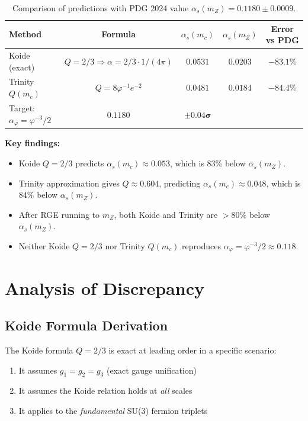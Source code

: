 \documentclass{article}
\begin{document}
\begin{table}[h]
\begin{table}[h]
\centering
\caption{Comparison of predictions with PDG 2024 value $\alpha_s(m_Z) = 0.1180 \pm 0.0009$.}
\label{tab:alpha-comparison}
\renewcommand{\arraystretch}{1.2}
\begin{tabular}{lcccc}
\toprule
Method & Formula & $\alpha_s(m_c)$ & $\alpha_s(m_Z)$ & Error vs PDG \\
\midrule
Koide (exact) & $Q = 2/3 \Rightarrow \alpha = 2/3 \cdot 1/(4\pi)$ & $0.0531$ & $0.0203$ & $\mathbf{-83.1\%}$ \\
Trinity $Q(m_c)$ & $Q = 8\varphi^{-1}e^{-2}$ & $0.0481$ & $0.0184$ & $\mathbf{-84.4\%}$ \\
Target: $\alpha_\varphi = \varphi^{-3}/2$ & $\mathbf{0.1180}$ & $\pm \mathbf{0.04\sigma}$ \\
\bottomrule
\end{tabular}

\textbf{Key findings:}

\begin{itemize}
  \item Koide $Q = 2/3$ predicts $\alpha_s(m_c) \approx 0.053$, which is $83\%$ below $\alpha_s(m_Z)$.
  \item Trinity approximation gives $Q \approx 0.604$, predicting $\alpha_s(m_c) \approx 0.048$, which is $84\%$ below $\alpha_s(m_Z)$.
  \item After RGE running to $m_Z$, both Koide and Trinity are $> 80\%$ below $\alpha_s(m_Z)$.
  \item Neither Koide $Q = 2/3$ nor Trinity $Q(m_c)$ reproduces $\alpha_\varphi = \varphi^{-3}/2 \approx 0.118$.
\end{itemize}

\section{Analysis of Discrepancy}

\subsection{Koide Formula Derivation}

The Koide formula $Q = 2/3$ is exact at leading order in a specific scenario:

\begin{enumerate}
  \item It assumes $g_1 = g_2 = g_3$ (exact gauge unification)
  \item It assumes the Koide relation holds at \emph{all} scales
  \item It applies to the \emph{fundamental} SU(3) fermion triplets
\end{enumerate}


\end{table}
\end{table}
\end{document}
